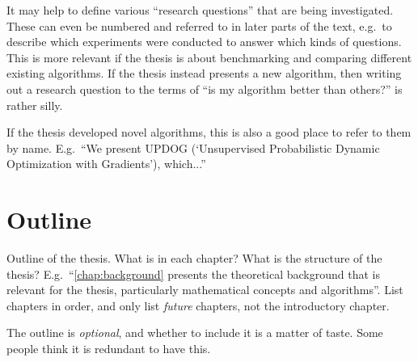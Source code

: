 It may help to define various ``research questions'' that are being investigated.
These can even be numbered and referred to in later parts of the text, e.g.\ to describe which experiments were conducted to answer which kinds of questions.
This is more relevant if the thesis is about benchmarking and comparing different existing algorithms.
If the thesis instead presents a new algorithm, then writing out a research question to the terms of ``is my algorithm better than others?'' is rather silly.

If the thesis developed novel algorithms, this is also a good place to refer to them by name.
E.g.\ ``We present UPDOG (`Unsupervised Probabilistic Dynamic Optimization with Gradients'), which...''

\section{Outline}

Outline of the thesis.
What is in each chapter? What is the structure of the thesis?
E.g.\ ``\cref{chap:background} presents the theoretical background that is relevant for the thesis, particularly mathematical concepts and algorithms''.
List chapters in order, and only list \emph{future} chapters, not the introductory chapter.

The outline is \emph{optional}, and whether to include it is a matter of taste.
Some people think it is redundant to have this.


